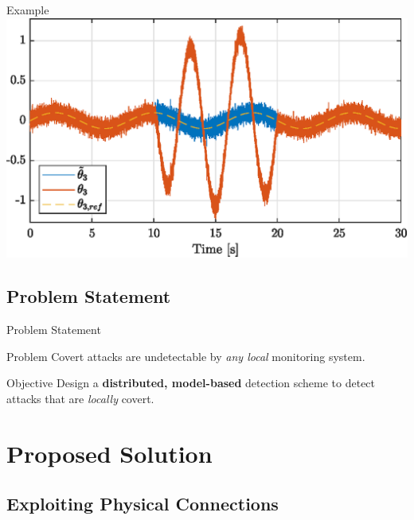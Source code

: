 \documentclass[presentation]{beamer}
\begin{document}
\begin{frame}[c]{Example}
\centering
\vspace{2ex}
\includegraphics[height=0.65\paperheight]{fig/trajectories-pres.eps}    
\end{frame}

\subsection{Problem Statement}

\begin{frame}{Problem Statement}
\begin{block}{Problem}
    \centering\large
    Covert attacks are undetectable by \emph{any local} monitoring system.
\end{block}

\vspace{4ex}
\begin{alertblock}{Objective}
    \centering\large
    Design a  
    \textbf{distributed, model-based}  detection scheme 
    to detect attacks that are \emph{locally} covert.
\end{alertblock}
\end{frame}


\section{Proposed Solution}

\subsection{Exploiting Physical Connections}
\end{document}

